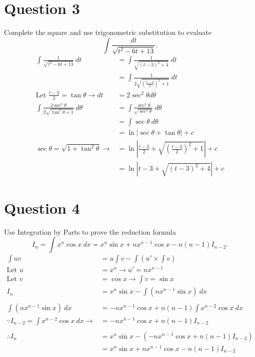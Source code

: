 \documentclass{article}
\begin{document}
\section*{Question 3}
Complete the square and use trigonometric substitution to evaluate
\[\int\frac{dt}{\sqrt{t^2-6t+13}}.\]
\begin{align*}
    \int\frac{1}{\sqrt{t^2-6t+13}}\:dt                        & =\int\frac{1}{\sqrt{(t-3)^2+4}}\:dt                    \\
                                                              & =\int\frac{1}{2\sqrt{(\frac{t-3}{2})^2+1}}\:dt         \\
    \text{Let }\frac{t-3}{2}=\tan\theta \rightarrow dt        & =2\sec^2\theta d\theta                                 \\
    \int\frac{2\sec^2\theta}{2\sqrt{\tan^2\theta+1}}\:d\theta & =\int\frac{\sec^2\theta}{\sqrt{\sec^2\theta}}\:d\theta \\
                                                              & =\int\sec\theta\:d\theta                               \\
                                                              & =\ln|\sec\theta+\tan\theta|+c                          \\
    \sec\theta = \sqrt{1+\tan^2\theta}\rightarrow             & =\ln|\frac{t-3}{2}+\sqrt{(\frac{t-3}{2})^2+1}|+c       \\
                                                              & = \ln|t-3+\sqrt{(t-3)^2+4}|+c
\end{align*}
\section*{Question 4}
Use Integration by Parts to prove the reduction formula
\[I_n=\int x^n\cos x\:dx=x^n\sin x+nx^{n-1}\cos x-n(n-1)I_{n-2}.\]
\begin{align*}
    \int uv                                                        & =u\int v-\int (u'\times \int v)               \\
    \text{Let }u                                                   & =x^n\rightarrow u'=nx^{n-1}                   \\
    \text{Let }v                                                   & =\cos x\rightarrow \int v=\sin x              \\
    I_n                                                            & =x^n\sin x-\int(nx^{n-1}\sin x)\:dx           \\
    \\
    \int(nx^{n-1}\sin x)\:dx                                       & =-nx^{n-1}\cos x+n(n-1)\int x^{n-2}\cos x\:dx \\
    \because I_{n-2}          = \int x^{n-2}\cos x\:dx \rightarrow & = -nx^{n-1}\cos x+n(n-1)I_{n-2}               \\
    \\
    \therefore I_n                                                 & =x^n\sin x-(-nx^{n-1}\cos x+n(n-1)I_{n-2})    \\
                                                                   & =x^n\sin x+nx^{n-1}\cos x-n(n-1)I_{n-2}
\end{align*}
\end{document}
